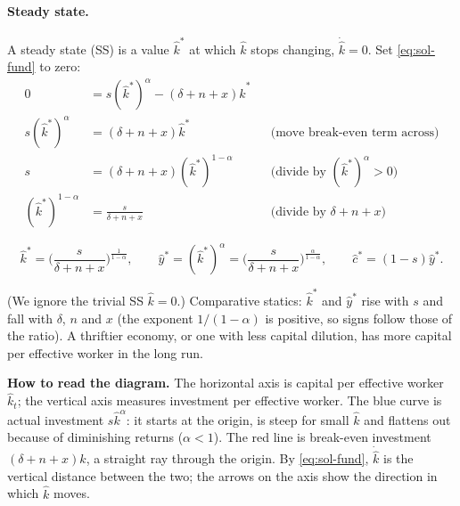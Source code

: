\paragraph{Steady state.} A steady state (SS) is a value $\hat k^{*}$ at which $\hat k$ stops changing, $\dot{\hat k}=0$. Set \eqref{eq:sol-fund} to zero:
\begin{align*}
0 &= s(\hat k^{*})^{\alpha}-(\delta+n+x)\hat k^{*}\\
s(\hat k^{*})^{\alpha} &= (\delta+n+x)\hat k^{*} && \text{(move break-even term across)}\\
s &= (\delta+n+x)(\hat k^{*})^{1-\alpha} && \text{(divide by $(\hat k^*)^{\alpha}>0$)}\\
(\hat k^{*})^{1-\alpha} &= \frac{s}{\delta+n+x} && \text{(divide by $\delta+n+x$)}
\end{align*}
\begin{keybox}[title=Steady state]
\begin{equation}\label{eq:sol-kss}
\hat k^{*}=\Big(\frac{s}{\delta+n+x}\Big)^{\frac{1}{1-\alpha}},\qquad
\hat y^{*}=(\hat k^{*})^{\alpha}=\Big(\frac{s}{\delta+n+x}\Big)^{\frac{\alpha}{1-\alpha}},\qquad
\hat c^{*}=(1-s)\hat y^{*}.
\end{equation}
\end{keybox}
(We ignore the trivial SS $\hat k=0$.) Comparative statics: $\hat k^*$ and $\hat y^*$ rise with $s$ and fall with $\delta$, $n$ and $x$ (the exponent $1/(1-\alpha)$ is positive, so signs follow those of the ratio). A thriftier economy, or one with less capital dilution, has more capital per effective worker in the long run.

\begin{center}
\end{center}
\textbf{How to read the diagram.} The horizontal axis is capital per effective worker $\hat k_t$; the vertical axis measures investment per effective worker. The blue curve is actual investment $s\hat k^{\alpha}$: it starts at the origin, is steep for small $\hat k$ and flattens out because of diminishing returns ($\alpha<1$). The red line is break-even investment $(\delta+n+x)\hat k$, a straight ray through the origin. By \eqref{eq:sol-fund}, $\dot{\hat k}$ is the vertical distance between the two; the arrows on the axis show the direction in which $\hat k$ moves.

